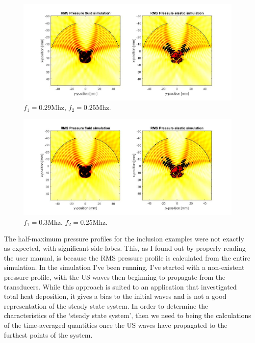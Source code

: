 \documentclass[10pt,a4paper]{article}
\begin{document}
\begin{figure}[H]
\hspace*{-4cm}                                                    
\includegraphics[scale=0.6]{comp_290kHz}
\caption{$f_1  = 0.29$Mhz, $f_2 = 0.25$Mhz.}
\label{comp_290kHz}
\end{figure}
\begin{figure}[H]
\hspace*{-4cm}                                                    
\includegraphics[scale=0.6]{comp_300kHz}
\caption{$f_1  = 0.3$Mhz, $f_2 = 0.25$Mhz.}
\label{comp_300kHz}
\end{figure}


The half-maximum pressure profiles for the inclusion examples were not exactly as expected, with significant side-lobes. This, as I found out by properly reading the user manual, is because the RMS pressure profile is calculated from the entire simulation. In the simulation I've been running, I've started with a non-existent pressure profile, with the US waves then beginning to propagate from the transducers. While this approach is suited to an application that investigated total heat deposition, it gives a bias to the initial waves and is not a good representation of the steady state system. In order to determine the characteristics of the `steady state system', then we need to being the calculations of the time-averaged quantities once the US waves have propagated to the furthest points of the system. 
\end{document}
